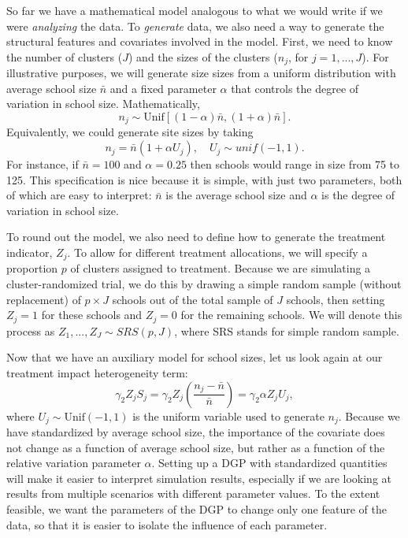 \documentclass[
]{book}
\begin{document}
So far we have a mathematical model analogous to what we would write if we were \emph{analyzing} the data.
To \emph{generate} data, we also need a way to generate the structural features and covariates involved in the model.
First, we need to know the number of clusters (\(J\)) and the sizes of the clusters (\(n_j\), for \(j = 1, ..., J\)).
For illustrative purposes, we will generate size sizes from a uniform distribution with average school size \(\bar{n}\) and a fixed parameter \(\alpha\) that controls the degree of variation in school size. Mathematically,
\[ n_j \sim \text{Unif}\left[ (1-\alpha)\bar{n}, (1+\alpha)\bar{n} \right].\]
Equivalently, we could generate site sizes by taking
\[n_j = \bar{n}(1 + \alpha U_j), \quad U_j \sim unif(-1, 1).\]
For instance, if \(\bar{n} = 100\) and \(\alpha = 0.25\) then schools would range in size from 75 to 125.
This specification is nice because it is simple, with just two parameters, both of which are easy to interpret: \(\bar{n}\) is the average school size and \(\alpha\) is the degree of variation in school size.

To round out the model, we also need to define how to generate the treatment indicator, \(Z_j\).
To allow for different treatment allocations, we will specify a proportion \(p\) of clusters assigned to treatment.
Because we are simulating a cluster-randomized trial, we do this by drawing a simple random sample (without replacement) of \(p \times J\) schools out of the total sample of \(J\) schools, then setting \(Z_j = 1\) for these schools and \(Z_j = 0\) for the remaining schools.
We will denote this process as \(Z_1,...,Z_J \sim SRS(p, J)\), where SRS stands for simple random sample.

Now that we have an auxiliary model for school sizes, let us look again at our treatment impact heterogeneity term:
\[ \gamma_{2} Z_j S_j = \gamma_{2} Z_j \left(\frac{n_j - \bar{n}}{\bar{n}}\right) = \gamma_{2}  \alpha Z_j U_j, \]
where \(U_j \sim \text{Unif}(-1,1)\) is the uniform variable used to generate \(n_j\).
Because we have standardized by average school size, the importance of the covariate does not change as a function of average school size, but rather as a function of the relative variation parameter \(\alpha\).
Setting up a DGP with standardized quantities will make it easier to interpret simulation results, especially if we are looking at results from multiple scenarios with different parameter values.
To the extent feasible, we want the parameters of the DGP to change only one feature of the data, so that it is easier to isolate the influence of each parameter.
\end{document}
